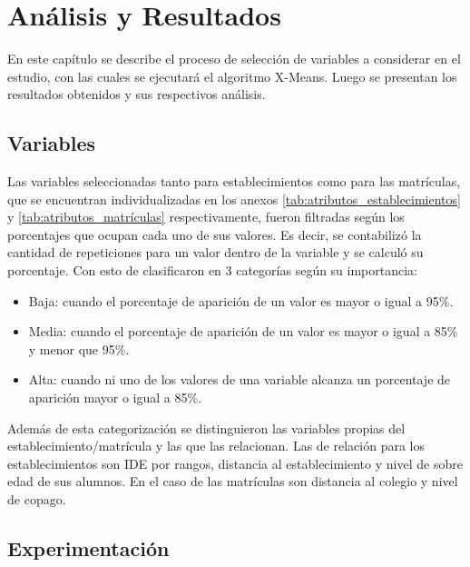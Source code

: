 \chapter{Análisis y Resultados}

En este capítulo se describe el proceso de selección de variables a considerar en el estudio,  con las cuales se ejecutará el algoritmo X-Means. Luego se presentan los resultados obtenidos y sus respectivos análisis.

\section{Variables}
Las variables seleccionadas tanto para establecimientos como para las matrículas, que se encuentran individualizadas en los anexos \ref{tab:atributos_establecimientos} y \ref{tab:atributos_matrículas} respectivamente, fueron filtradas según los porcentajes que ocupan cada uno de sus valores. Es decir, se contabilizó la cantidad de repeticiones para un valor dentro de la variable y se calculó su porcentaje. Con esto de clasificaron en 3 categorías según su importancia:


\begin{itemize}
    \item Baja: cuando el porcentaje de aparición de un valor es mayor o igual a 95\%. 
    \item Media: cuando el porcentaje de aparición de un valor es mayor o igual a 85\% y menor que 95\%.
    \item Alta: cuando ni uno de los valores de una variable alcanza un porcentaje de aparición mayor o igual a 85\%.
\end{itemize}

Además de esta categorización se distinguieron las variables propias del establecimiento/matrícula y las que las relacionan. Las de relación para los establecimientos son IDE por rangos, distancia al establecimiento y nivel de sobre edad de sus alumnos. En el caso de las matrículas son distancia al colegio y nivel de copago.

\section{Experimentación}


